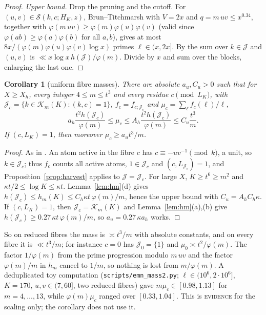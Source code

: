 \documentclass[10pt,reqno]{amsart}
\newtheorem{corollary}[theorem]{Corollary}
\theoremstyle{definition}
\newcommand{\K}{\mathcal K}
\newcommand{\J}{\mathcal J}
\newcommand{\Sset}{\mathcal S}
\newcommand{\status}[1]{\textup{\textsc{#1}}}
\begin{document}
\begin{proof}
\emph{Upper bound.}  Drop the pruning and the cutoff.  For
$(u,v)\in\Sset(k,c;H_K,z)$, Brun--Titchmarsh \cite[(8)]{TQ} with $V=2x$
and $q=m\,uv\leq x^{0.34}$, together with
$\varphi(m\,uv)\geq\varphi(m)\varphi(u)\varphi(v)$ (valid since
$\varphi(ab)\geq\varphi(a)\varphi(b)$ for all $a,b$), gives at most
$8x/(\varphi(m)\varphi(u)\varphi(v)\log x)$ primes $\ell\in(x,2x]$.
By \cite[(12)]{TQ} the sum over $k\in\J$ and $(u,v)$ is
$\ll x\log x\,h(\J)/\varphi(m)$.  Divide by $x$ and sum over the blocks,
enlarging the last one.
\end{proof}

\begin{corollary}[uniform fibre masses]\label{cor:fibre}
There are absolute $a_u,C_u>0$ such that for $X\geq X_h$, every integer
$4\leq m\leq t^3$ and \emph{every} residue $c\pmod{L_K}$, with
$\J_c=\{k\in\K_m(K):(k,c)=1\}$, $f_c=f_{c;\J_c}$ and
$\mu_c=\sum_\ell f_c(\ell)/\ell$,
\[
 a_h\frac{t^2h(\J_c)}{\varphi(m)}\leq\mu_c
 \leq A_h\frac{t^2h(\J_c)}{\varphi(m)}\leq C_u\frac{t^3}m.
\]
If $(c,L_K)=1$, then moreover $\mu_c\geq a_ut^3/m$.
\end{corollary}

\begin{proof}
As in \cite[Corollary~4.3]{TQ}.  An atom active in the fibre $c$ has
$c\equiv-uv^{-1}\pmod k$, a unit, so $k\in\J_c$; thus $f_c$ counts all
active atoms, $1\in\J_c$ and $(c,L_{\J_c})=1$, and
Proposition~\ref{prop:harvest} applies to $\J=\J_c$.  For large $X$,
$K\geq t^6\geq m^2$ and $\kappa t/2\leq\log K\leq\kappa t$.
Lemma~\ref{lem:hm}(d) gives
$h(\J_c)\leq h_m(K)\leq C_h\kappa t\,\varphi(m)/m$, hence the upper bound with
$C_u=A_hC_h\kappa$.  If $(c,L_K)=1$, then $\J_c=\K_m(K)$ and
Lemma~\ref{lem:hm}(a),(b) give $h(\J_c)\geq0.27\,\kappa t\,\varphi(m)/m$, so
$a_u=0.27\,\kappa a_h$ works.
\end{proof}

So on reduced fibres the mass is $\asymp t^3/m$ with absolute constants,
and on every fibre it is $\ll t^3/m$; for instance $c=0$ has
$\J_0=\{1\}$ and $\mu_0\asymp t^2/\varphi(m)$.  The factor $1/\varphi(m)$
from the prime progression modulo $m\,uv$ and the factor
$\varphi(m)/m$ in $h_m$ cancel to $1/m$, so nothing is lost from
$m/\varphi(m)$.  A deduplicated toy computation
(\texttt{scripts/emn\_mass2.py}; $\ell\in(10^6,2\cdot10^6]$, $K=170$,
$u,v\in(7,60]$, two reduced fibres) gave $m\mu_c\in[0.98,1.13]$ for
$m=4,\ldots,13$, while $\varphi(m)\mu_c$ ranged over $[0.33,1.04]$.
This is \status{evidence} for the scaling only; the corollary does not
use it.
\end{document}

